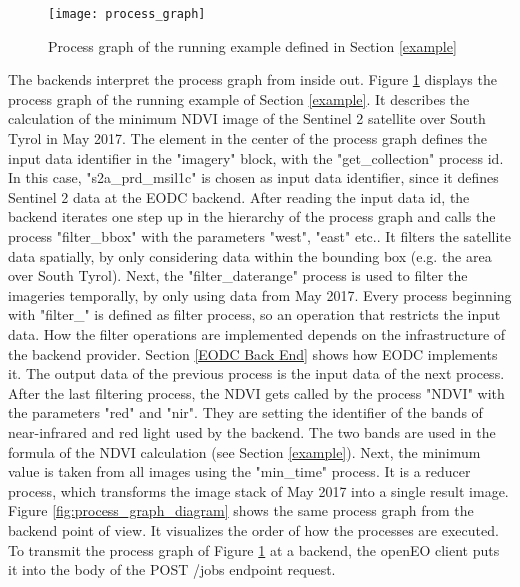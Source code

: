 \documentclass[draft,final]{vutinfth} %
\begin{document}
\begin{figure}[h]
	\centering
	\texttt{[image: process\_graph]}
	\caption{Process graph of the running example defined in Section \ref{example}}
	\label{fig:process_graph} %
\end{figure}


The backends interpret the process graph from inside out. Figure \ref{fig:process_graph} displays the process graph of the running example of Section \ref{example}. It describes the calculation of the minimum NDVI image of the Sentinel 2 satellite over South Tyrol in May 2017. The element in the center of the process graph defines the input data identifier in the "imagery" block, with the "get\_collection" process id. In this case, "s2a\_prd\_msil1c" is chosen as input data identifier, since it defines Sentinel 2 data at the EODC backend.
After reading the input data id, the backend iterates one step up in the hierarchy of the process graph and calls the process "filter\_bbox" with the parameters "west", "east" etc.. It filters the satellite data spatially, by only considering data within the bounding box (e.g. the area over South Tyrol). Next, the "filter\_daterange" process is used to filter the imageries temporally, by only using data from May 2017. Every process beginning with "filter\_" is defined as filter process, so an operation that restricts the input data. 
{How the filter operations are implemented depends on the infrastructure of the backend provider. Section \ref{EODC Back End} shows how EODC implements it.}
The output data of the previous process is the input data of the next process. After the last filtering process, the NDVI gets called by the process "NDVI" with the parameters "red" and "nir". They are setting the identifier of the bands of near-infrared and red light used by the backend. The two bands are used in the formula of the NDVI calculation (see Section \ref{example}). Next, the minimum value is taken from all images using the "min\_time" process. It is a reducer process, which transforms the image stack of May 2017 into a single result image. Figure \ref{fig:process_graph_diagram} shows the same process graph from the backend point of view. It visualizes the order of how the processes are executed. To transmit the process graph of Figure \ref{fig:process_graph} at a backend, the openEO client puts it into the body of the POST /jobs endpoint request.
\end{document}
